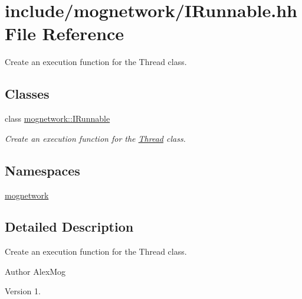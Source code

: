 \hypertarget{_i_runnable_8hh}{\section{include/mognetwork/\-I\-Runnable.hh File Reference}
\label{_i_runnable_8hh}
}


Create an execution function for the Thread class.  


\subsection*{Classes}
\begin{DoxyCompactItemize}
\item 
class \hyperlink{classmognetwork_1_1_i_runnable}{mognetwork\-::\-I\-Runnable}
\begin{DoxyCompactList}\small\item\em Create an execution function for the \hyperlink{classmognetwork_1_1_thread}{Thread} class. \end{DoxyCompactList}\end{DoxyCompactItemize}
\subsection*{Namespaces}
\begin{DoxyCompactItemize}
\item 
\hyperlink{namespacemognetwork}{mognetwork}
\end{DoxyCompactItemize}


\subsection{Detailed Description}
Create an execution function for the Thread class. \begin{DoxyAuthor}{Author}
Alex\-Mog 
\end{DoxyAuthor}
\begin{DoxyVersion}{Version}
1. 
\end{DoxyVersion}
